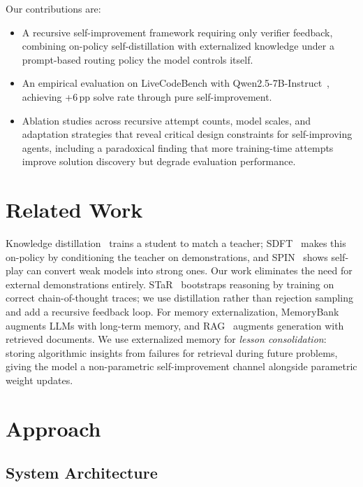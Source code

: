 \documentclass[11pt]{article}
\begin{document}
Our contributions are:
\begin{itemize}[nosep]
    \item A recursive self-improvement framework requiring only verifier feedback, combining on-policy self-distillation with externalized knowledge under a prompt-based routing policy the model controls itself.
    \item An empirical evaluation on LiveCodeBench with Qwen2.5-7B-Instruct~\citep{qwen2025qwen25}, achieving +6\,pp solve rate through pure self-improvement.
    \item Ablation studies across recursive attempt counts, model scales, and adaptation strategies that reveal critical design constraints for self-improving agents, including a paradoxical finding that more training-time attempts improve solution discovery but degrade evaluation performance.
\end{itemize}

\section{Related Work}

Knowledge distillation~\citep{hinton2015distilling} trains a student to match a teacher; SDFT~\citep{shenfeld2026sdft} makes this on-policy by conditioning the teacher on demonstrations, and SPIN~\citep{chen2024spin} shows self-play can convert weak models into strong ones. Our work eliminates the need for external demonstrations entirely. STaR~\citep{zelikman2022star} bootstraps reasoning by training on correct chain-of-thought traces; we use distillation rather than rejection sampling and add a recursive feedback loop. For memory externalization, MemoryBank~\citep{zhong2024memorybank} augments LLMs with long-term memory, and RAG~\citep{lewis2020rag} augments generation with retrieved documents. We use externalized memory for \emph{lesson consolidation}: storing algorithmic insights from failures for retrieval during future problems, giving the model a non-parametric self-improvement channel alongside parametric weight updates.

\section{Approach}

\subsection{System Architecture}
\end{document}
